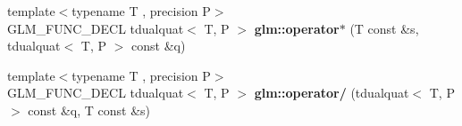 \begin{DoxyCompactItemize}
\item 
\hypertarget{group__gtx__dual__quaternion_ga0aedf77f3e7d45464501570c28df0ed7}{{\footnotesize template$<$typename T , precision P$>$ }\\G\-L\-M\-\_\-\-F\-U\-N\-C\-\_\-\-D\-E\-C\-L tdualquat$<$ T, P $>$ {\bfseries glm\-::operator$\ast$} (T const \&s, tdualquat$<$ T, P $>$ const \&q)}\label{group__gtx__dual__quaternion_ga0aedf77f3e7d45464501570c28df0ed7}

\item 
\hypertarget{group__gtx__dual__quaternion_gad27b1d064624dd6ff1ecc205616323ba}{{\footnotesize template$<$typename T , precision P$>$ }\\G\-L\-M\-\_\-\-F\-U\-N\-C\-\_\-\-D\-E\-C\-L tdualquat$<$ T, P $>$ {\bfseries glm\-::operator/} (tdualquat$<$ T, P $>$ const \&q, T const \&s)}\label{group__gtx__dual__quaternion_gad27b1d064624dd6ff1ecc205616323ba}


\end{DoxyCompactItemize}
